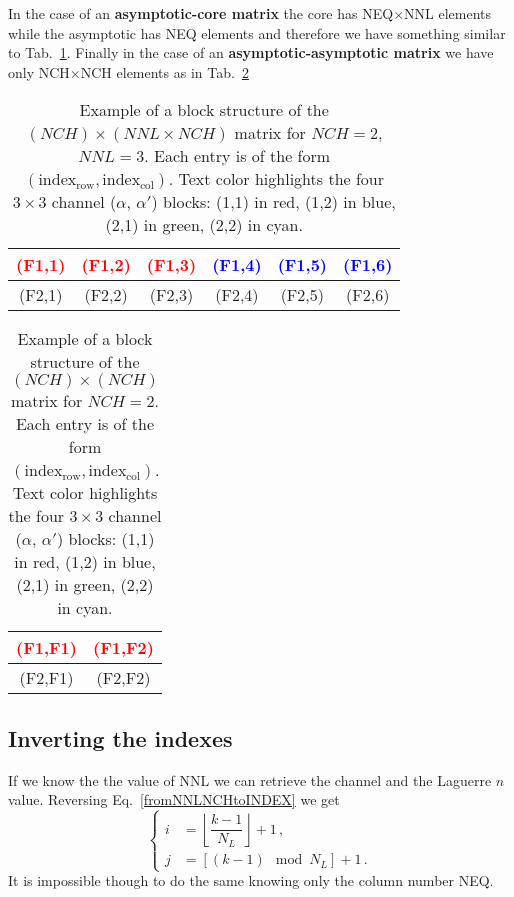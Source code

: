\documentclass[10pt,a4paper]{article}
\newcommand{\eq}[1]{Eq.~#1}
\begin{document}
	
	In the case of an \textbf{asymptotic-core matrix} the core has NEQ$\times$NNL elements while the asymptotic has NEQ elements and therefore we have something similar to Tab.~\ref{tab:example2}.
	Finally in the case of an \textbf{asymptotic-asymptotic matrix} we have only NCH$\times$NCH elements as in Tab.~\ref{tab:example3}
	 \begin{table}[t]
	 	\centering
	 	\renewcommand{\arraystretch}{1.3}
	 	\setlength{\tabcolsep}{6pt}
	 	\begin{tabular}{|ccc|ccc|}
	 		\hline
	 		\textcolor{red}{(F1,1)} & \textcolor{red}{(F1,2)} & \textcolor{red}{(F1,3)} & \textcolor{blue}{(F1,4)} & \textcolor{blue}{(F1,5)} & \textcolor{blue}{(F1,6)} \\\hline
	 		\textcolor{green!60!black}{(F2,1)} & \textcolor{green!60!black}{(F2,2)} & \textcolor{green!60!black}{(F2,3)} & \textcolor{cyan!80!black}{(F2,4)} & \textcolor{cyan!80!black}{(F2,5)} & \textcolor{cyan!80!black}{(F2,6)} \\
	 		\hline
	 	\end{tabular}
	 	\caption{
	 		Example of a block structure of the $(NCH) \times (NNL \times NCH)$ matrix for $NCH=2$, $NNL=3$.
	 		Each entry is of the form $(\mathrm{index}_\mathrm{row}, \mathrm{index}_\mathrm{col})$.
	 		Text color highlights the four $3\times3$ channel ($\alpha$, $\alpha'$) blocks: (1,1) in red, (1,2) in blue, (2,1) in green, (2,2) in cyan.
	 	}
	 	\label{tab:example2}
	 \end{table}
	 \begin{table}[t]
	 	\centering
	 	\renewcommand{\arraystretch}{1.3}
	 	\setlength{\tabcolsep}{6pt}
	 	\begin{tabular}{|c|c|}
	 		\hline
	 		\textcolor{red}{(F1,F1)} & \textcolor{red}{(F1,F2)}  \\\hline
	 		\textcolor{green!60!black}{(F2,F1)} & \textcolor{green!60!black}{(F2,F2)}\\
	 		\hline
	 	\end{tabular}
	 	\caption{
	 		Example of a block structure of the $(NCH) \times (NCH)$ matrix for $NCH=2$.
	 		Each entry is of the form $(\mathrm{index}_\mathrm{row}, \mathrm{index}_\mathrm{col})$.
	 		Text color highlights the four $3\times3$ channel ($\alpha$, $\alpha'$) blocks: (1,1) in red, (1,2) in blue, (2,1) in green, (2,2) in cyan.
	 	}
	 	\label{tab:example3}
	 \end{table}
	 
	 \subsection*{Inverting the indexes}
	 If we know the the value of NNL we can retrieve the channel and the Laguerre $n$ value.
	 Reversing \eq{\eqref{fromNNLNCHtoINDEX}} we get
	 \begin{equation}
	 	\begin{cases}
	 		i &= \left\lfloor\dfrac{k-1}{N_L}\right\rfloor+1\,,\\
	 		j &= [(k-1)\mod N_L ]+1\,.
	 	\end{cases}
	 \end{equation}
	 It is impossible though to do the same knowing only the column number NEQ.
	 
\end{document}

